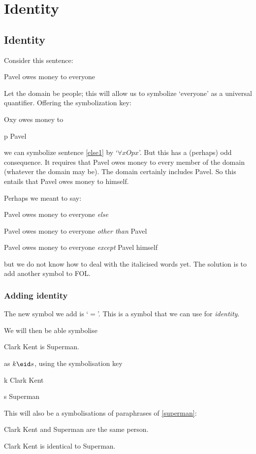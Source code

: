 \part{Identity}
\label{ch.identity}

\chapter{Identity}

Consider this sentence:
\begin{earg}
\item[\ex{else1}] Pavel owes money to everyone
\end{earg}
Let the domain be people; this will allow us to symbolize `everyone' as a universal quantifier. Offering the symbolization key:
	\begin{ekey}
		\item[Oxy]  owes money to 
		\item[p] Pavel
	\end{ekey}
we can symbolize sentence \ref{else1} by `$\forall x Opx$'. But this has a (perhaps) odd consequence. It requires that Pavel owes money to every member of the domain (whatever the domain may be). The domain certainly includes Pavel. So this entails that Pavel owes money to himself.

Perhaps we meant to say:
	\begin{earg}
		\item[\ex{else1b}] Pavel owes money to everyone \emph{else}
		\item[\ex{else1c}] Pavel owes money to everyone \emph{other than} Pavel
		\item[\ex{else1d}] Pavel owes money to everyone \emph{except} Pavel himself
	\end{earg}
but we do not know how to deal with the italicised words yet. The solution is to add another symbol to FOL.

\section{Adding identity}

The new symbol we add is `$=$'. This is a symbol that we can use for \emph{identity}.

We will then be able symbolise
\begin{earg}
\item[\ex{superman}] Clark Kent is Superman.
\end{earg}
as $k\eid s$, using the symbolisation key
\begin{ekey}
\item[k] Clark Kent
\item[s] Superman
\end{ekey}
This will also be a symbolisations of paraphrases of \ref{superman}:
\begin{earg}
\item[\ex{superman1b}] Clark Kent and Superman are the same person.
\item[\ex{superman1c}] Clark Kent is identical to Superman.
\end{earg}

